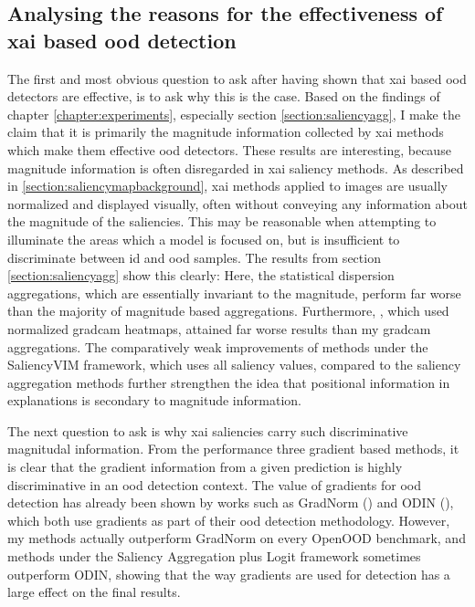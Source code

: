 \documentclass[UKenglish]{uiomasterthesis} %
\theoremstyle{definition}
\begin{document}
\subsection{Analysing the reasons for the effectiveness of \ac{xai} based \ac{ood} detection}

The first and most obvious question to ask after having shown that \ac{xai} based \ac{ood} detectors are effective, is to ask why this is the case. Based on the findings of chapter \ref{chapter:experiments}, especially section \ref{section:saliencyagg}, I make the claim that it is primarily the magnitude information collected by \ac{xai} methods which make them effective \ac{ood} detectors. These results are interesting, because magnitude information is often disregarded in \ac{xai} saliency methods. As described in \ref{section:saliencymapbackground}, \ac{xai} methods applied to images are usually normalized and displayed visually, often without conveying any information about the magnitude of the saliencies. This may be reasonable when attempting to illuminate the areas which a model is focused on, but is insufficient to discriminate between \ac{id} and \ac{ood} samples. The results from section \ref{section:saliencyagg} show this clearly: Here, the statistical dispersion aggregations, which are essentially invariant to the magnitude, perform far worse than the majority of magnitude based aggregations. Furthermore, \cite{martinez}, which used normalized \ac{gradcam} heatmaps, attained far worse results than my \ac{gradcam} aggregations. The comparatively weak improvements of methods under the SaliencyVIM framework, which uses all saliency values, compared to the saliency aggregation methods further strengthen the idea that positional information in explanations is secondary to magnitude information.

The next question to ask is why \ac{xai} saliencies carry such discriminative magnitudal information. From the performance three gradient based methods, it is clear that the gradient information from a given prediction is highly discriminative in an \ac{ood} detection context. The value of gradients for \ac{ood} detection has already been shown by works such as GradNorm (\cite{gradnorm}) and ODIN (\cite{odin}), which both use gradients as part of their \ac{ood} detection methodology. However, my methods actually outperform GradNorm on every OpenOOD benchmark, and methods under the Saliency Aggregation plus Logit framework sometimes outperform ODIN, showing that the way gradients are used for detection has a large effect on the final results.
\end{document}

